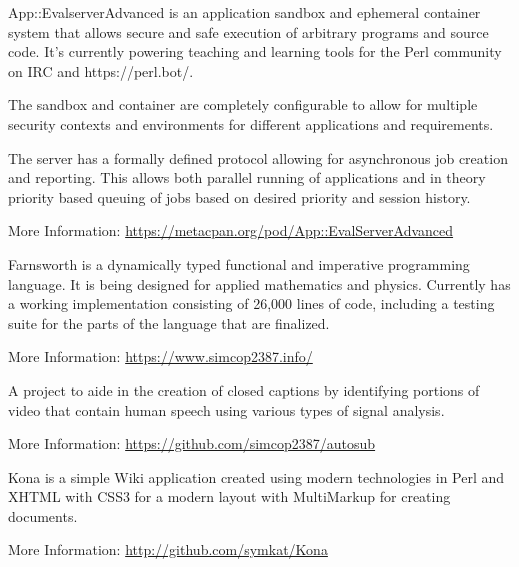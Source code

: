 \documentclass[table,tmargin=1in,bmargin=1in,letterpaper]{resume}
\begin{document}
\begin{compactitem}
\item App::EvalserverAdvanced is an application sandbox and ephemeral container system that allows secure and safe execution of arbitrary programs and source code.  It's currently powering teaching and learning tools for the Perl community on IRC and https://perl.bot/. 
\item The sandbox and container are completely configurable to allow for multiple security contexts and environments for different applications and requirements.
\item The server has a formally defined protocol allowing for asynchronous job creation and reporting.  This allows both parallel running of applications and in theory priority based queuing of jobs based on desired priority and session history.
\item More Information: \url{https://metacpan.org/pod/App::EvalServerAdvanced}
\end{compactitem}

\begin{compactitem}
\item Farnsworth is a dynamically typed functional and imperative programming language.  
It is being designed for applied mathematics and physics.  Currently has a working implementation 
consisting of 26,000 lines of code, including a testing suite for the parts of the language that are finalized.
\item More Information: \url{https://www.simcop2387.info/}
\end{compactitem}


\begin{compactitem}
\item A project to aide in the creation of closed captions by identifying portions of 
video that contain human speech using various types of signal analysis.
\item More Information: \url{https://github.com/simcop2387/autosub}
\end{compactitem}


\begin{compactitem}
\item Kona is a simple Wiki application created using modern technologies in Perl and XHTML 
with CSS3 for a modern layout with MultiMarkup for creating documents.
\item More Information: \url{http://github.com/symkat/Kona}
\end{compactitem}
\end{document}
